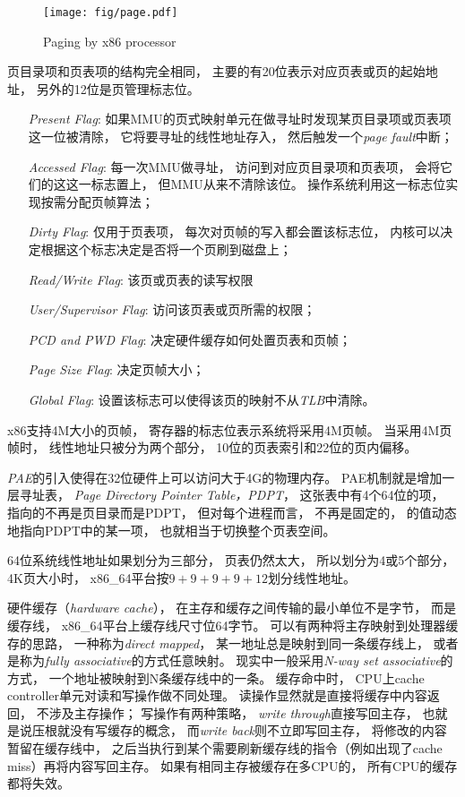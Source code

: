\begin{figure}[!ht]
  \centering
  \texttt{[image: fig/page.pdf]}
  \caption{Paging by x86 processor}\label{fig:page}
\end{figure}

页目录项和页表项的结构完全相同，
主要的有20位表示对应页表或页的起始地址，
另外的12位是页管理标志位。
\begin{itemize}
\item[\emph{Present Flag}:]
  如果MMU的页式映射单元在做寻址时发现某页目录项或页表项这一位被清除，
  它将要寻址的线性地址存入，
  然后触发一个\emph{page fault}中断；
\item[\emph{ Accessed Flag}:]
  每一次MMU做寻址，
  访问到对应页目录项和页表项，
  会将它们的这这一标志置上，
  但MMU从来不清除该位。
  操作系统利用这一标志位实现按需分配页帧算法；
\item[\emph{ Dirty Flag}:]
  仅用于页表项，
  每次对页帧的写入都会置该标志位，
  内核可以决定根据这个标志决定是否将一个页刷到磁盘上；
\item[\emph{ Read/Write Flag}:]
  该页或页表的读写权限
\item[\emph{ User/Supervisor Flag}:]
  访问该页表或页所需的权限；
\item[\emph{ PCD and PWD Flag}:]
  决定硬件缓存如何处置页表和页帧；
\item[\emph{ Page Size Flag}:]
  决定页帧大小；
\item[\emph{ Global Flag}:]
  设置该标志可以使得该页的映射不从\emph{TLB}中清除。
\end{itemize}

x86支持4M大小的页帧，
寄存器的标志位表示系统将采用4M页帧。
当采用4M页帧时，
线性地址只被分为两个部分，
10位的页表索引和22位的页内偏移。

{\em PAE}的引入使得在32位硬件上可以访问大于4G的物理内存。
PAE机制就是增加一层寻址表，
{\em Page Directory Pointer Table，PDPT}，
这张表中有4个64位的项，
指向的不再是页目录而是PDPT，
但对每个进程而言，
不再是固定的，
的值动态地指向PDPT中的某一项，
也就相当于切换整个页表空间。

64位系统线性地址如果划分为三部分，
页表仍然太大，
所以划分为4或5个部分，
4K页大小时，
x86\_64平台按$9 + 9 + 9 + 9 + 12$划分线性地址。

硬件缓存（{\em hardware cache}），
在主存和缓存之间传输的最小单位不是字节，
而是缓存线，
x86\_64平台上缓存线尺寸位64字节。
可以有两种将主存映射到处理器缓存的思路，
一种称为{\em direct mapped}，
某一地址总是映射到同一条缓存线上，
或者是称为{\em fully associative}的方式任意映射。
现实中一般采用{\em N-way set associative}的方式，
一个地址被映射到N条缓存线中的一条。
缓存命中时，
CPU上cache controller单元对读和写操作做不同处理。
读操作显然就是直接将缓存中内容返回，
不涉及主存操作；
写操作有两种策略，
{\em write through}直接写回主存，
也就是说压根就没有写缓存的概念，
而{\em write back}则不立即写回主存，
将修改的内容暂留在缓存线中，
之后当执行到某个需要刷新缓存线的指令（例如出现了cache miss）再将内容写回主存。
如果有相同主存被缓存在多CPU的，
所有CPU的缓存都将失效。
